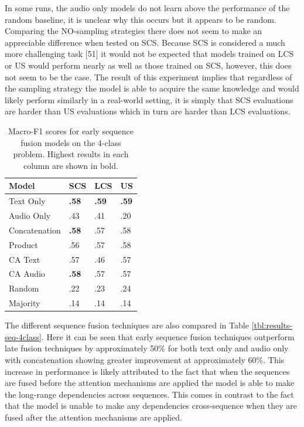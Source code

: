 \documentclass[twocolumn]{article}
\begin{document}
In some runs, the audio only models do not learn above the performance
of the random baseline, it is unclear why this occurs but it appears to
be random. Comparing the NO-sampling strategies there does not seem to
make an appreciable difference when tested on SCS. Because SCS is
considered a much more challenging task {[}51{]} it would not be
expected that models trained on LCS or US would perform nearly as well
as those trained on SCS, however, this does not seem to be the case. The
result of this experiment implies that regardless of the sampling
strategy the model is able to acquire the same knowledge and would
likely perform similarly in a real-world setting, it is simply that SCS
evaluations are harder than US evaluations which in turn are harder than
LCS evaluations.

\begin{table}[h]
\centering
\caption{Macro-F1 scores for early sequence fusion models on the 4-class problem. Highest results in each column are shown in bold.\label{tbl:results-early-4class}}
\begin{tabular}{|l|lll|}
\hline
Model         & SCS          & LCS          & US          \\ \hline
Text Only     & \textbf{.58} & \textbf{.59} & \textbf{.59} \\
Audio Only    & .43          & .41          & .20          \\ \hline
Concatenation & \textbf{.58} & .57          & .58          \\
Product       & .56          & .57          & .58          \\
CA Text       & .57          & .46          & .57          \\
CA Audio      & \textbf{.58} & .57          & .57          \\ \hline
Random        & .22          & .23          & .24          \\
Majority      & .14          & .14          & .14          \\ \hline
\end{tabular}
\end{table}

The different sequence fusion techniques are also compared in Table
\ref{tbl:results-seq-4class}. Here it can be seen that early sequence
fusion techniques outperform late fusion techniques by approximately
50\% for both text only and audio only with concatenation showing
greater improvement at approximately 60\%. This increase in performance
is likely attributed to the fact that when the sequences are fused
before the attention mechanisms are applied the model is able to make
the long-range dependencies across sequences. This comes in contrast to
the fact that the model is unable to make any dependencies
cross-sequence when they are fused after the attention mechanisms are
applied.
\end{document}
